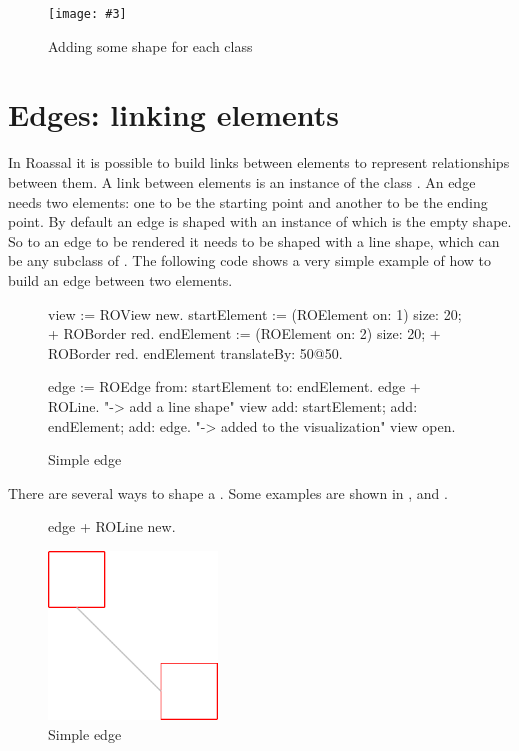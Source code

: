 \documentclass[a4paper,10pt,twoside]{book}
\newcommand{\fig}[4]{
		\begin{figure}[#1]
			\centering
			\texttt{[image: \#3]}
			\caption{\label{fig:#3}#4}
		\end{figure}}
\begin{document}
\fig{H}{0.6}{hier2}{Adding some shape for each class}


\section{Edges: linking elements} 

In Roassal it is possible to build links between elements to represent relationships between them. A link between elements is an instance of the class . An edge needs two elements: one to be the starting point and another to be the ending point. 
By default an edge is shaped with an instance of  which is the empty shape. So to an edge to be rendered it needs to be shaped with a line shape, which can be any subclass of .
The following code shows a very simple example of how to build an edge between two elements.

\begin{figure}[H]
 \begin{code}{}
view := ROView new.
startElement := (ROElement on: 1) size: 20; + ROBorder red.
endElement := (ROElement on: 2)  size: 20; + ROBorder red.
endElement translateBy: 50@50.

edge := ROEdge from: startElement to: endElement.
edge + ROLine. "-> add a line shape"
view 
	add: startElement; 
	add: endElement; 
	add: edge. "-> added to the visualization"
view open.
\end{code}   
\caption{Simple edge}
\label{fig:simpleEdge}
\end{figure} 

There are several ways to shape a . Some examples are shown in ,  and .

\begin{figure}[H]
      \begin{minipage}[t]{0.5\textwidth}
      \vspace{0pt}
     \begin{code}{}
edge + ROLine new. \end{code}
   \end{minipage}
   \hfill
   \begin{minipage}[t]{0.4\textwidth}
      \vspace{0pt} \raggedright
       \centering
		\includegraphics[width=0.4\textwidth]{line}
   \end{minipage}
\caption{Simple edge}
\label{fig:line}
\end{figure} 
\end{document}
